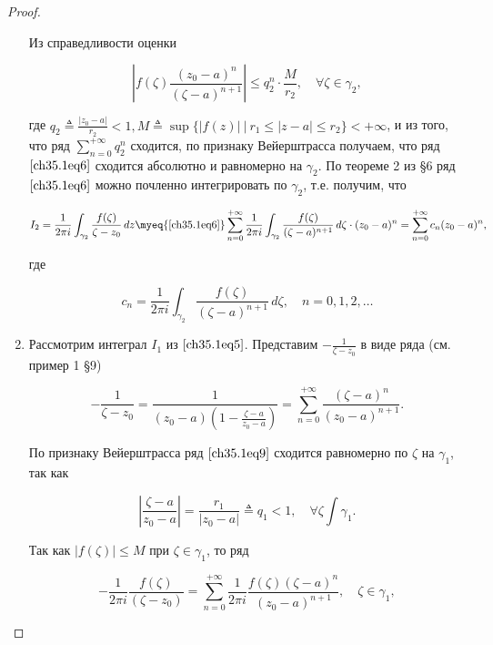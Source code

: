\begin{proof}
\begin{enumerate}
Из справедливости оценки

$$
\left| f(\zeta) \frac{(z_0 - a)^n}{(\zeta - a)^{n + 1}}\right| \le q_{2}^n \cdot \frac{M}{r_2}, \quad \forall \zeta \in \gamma_2,
$$

где $q_2 \triangleq \frac{|z_0 - a|}{r_2} < 1, M \triangleq \sup \{ |f(z)| \: \big| \: r_1 \le |z - a| \le r_2\} < +\infty$, и из того, что ряд $\sum\limits_{n = 0}^{+\infty} q_{2}^n$ сходится, по признаку Вейерштрасса получаем, что ряд $\eqref{ch35.1eq6}$ сходится абсолютно и равномерно на $\gamma_2$. По теореме 2 из \S 6 ряд $\eqref{ch35.1eq6}$ можно почленно интегрировать по $\gamma_2$, т.е. получим, что 

\begin{equation} \label{ch35.1eq7}
I_2 = \frac{1}{2\pi i} \int_{\gamma_2} \frac{f(\zeta)}{\zeta - z_0} \,d z \myeq{\eqref{ch35.1eq6}} \sum\limits_{n = 0}^{+\infty} \frac{1}{2\pi i} \int_{\gamma_2} \frac{f(\zeta)}{(\zeta - a)^{n + 1}} \,d\zeta \cdot (z_0 - a)^n = \sum\limits_{n = 0}^{+\infty} c_n (z_0 - a)^n,
\end{equation}

где 

\begin{equation} \label{ch35.1eq8}
c_n = \frac{1}{2\pi i} \int_{\gamma_2}  \frac{f(\zeta)}{(\zeta - a)^{n + 1}} \,d\zeta, \quad n = 0,1,2,\ldots
\end{equation}

\item

Рассмотрим интеграл $I_1$ из $\eqref{ch35.1eq5}$. Представим $-\frac{1}{\zeta - z_0}$ в виде ряда (см. пример 1 \S 9)

\begin{equation} \label{ch35.1eq9}
-\frac{1}{\zeta - z_0} = \frac{1}{(z_0 - a) \left( 1 - \frac{\zeta - a}{z_0 - a}\right)} = \sum_{n = 0}^{+\infty} \frac{(\zeta - a)^n}{(z_0 - a)^{n + 1}}.
\end{equation}

По признаку Вейерштрасса ряд $\eqref{ch35.1eq9}$ сходится равномерно по $\zeta$ на $\gamma_1$, так как

$$
\left| \frac{\zeta - a}{z_0 - a}\right| = \frac{r_1}{|z_0 - a|} \triangleq q_1 < 1, \quad \forall \zeta \int \gamma_1.
$$

Так как $|f(\zeta)| \le M$ при $\zeta \in \gamma_1$, то ряд

\begin{equation} \label{ch35.1eq10}
-\frac{1}{2\pi i} \frac{f(\zeta)}{(\zeta - z_0)} = \sum\limits_{n = 0}^{+\infty} \frac{1}{2\pi i} \frac{f(\zeta)(\zeta - a)^n}{(z_0 - a)^{n + 1}}, \quad \zeta \in \gamma_1,
\end{equation}


\end{enumerate}
\end{proof}
